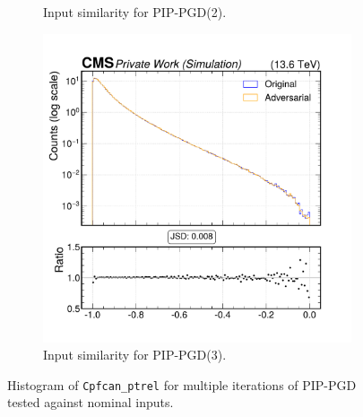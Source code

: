 \begin{figure}[h]
\begin{subfigure}[t]{0.32\textwidth}
    \caption*{Input similarity for PIP-PGD(2).}
  \end{subfigure}\hfill
  \begin{subfigure}[t]{0.32\textwidth}
    \includegraphics[width=\linewidth]{media/output/features/compare/combined_it_3/cmp_cpf_arr_Cpfcan_ptrel.pdf}
    \caption*{Input similarity for PIP-PGD(3).}
  \end{subfigure}

  \caption*{Histogram of \texttt{Cpfcan\_ptrel} for multiple iterations of PIP-PGD tested against nominal inputs.}
  \label{fig:combined_input_Cpfcan_ptrel}
\end{figure}

